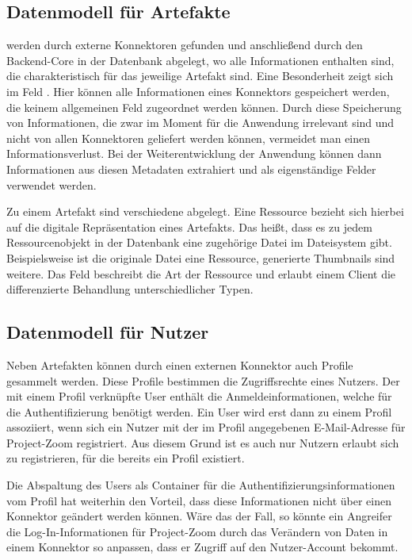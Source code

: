 \subsection{Datenmodell für Artefakte}

 werden durch externe Konnektoren gefunden und anschließend durch den Backend-Core in der Datenbank abgelegt, wo alle Informationen enthalten sind, die charakteristisch für das jeweilige Artefakt sind. Eine Besonderheit zeigt sich im Feld . Hier können alle Informationen eines Konnektors gespeichert werden, die keinem allgemeinen Feld zugeordnet werden können. Durch diese Speicherung von Informationen, die zwar im Moment für die Anwendung irrelevant sind und nicht von allen Konnektoren geliefert werden können, vermeidet man einen Informationsverlust. Bei der Weiterentwicklung der Anwendung können dann Informationen aus diesen Metadaten extrahiert und als eigenständige Felder verwendet werden. 

Zu einem Artefakt sind verschiedene  abgelegt. Eine Ressource bezieht sich hierbei auf die digitale Repräsentation eines Artefakts. Das heißt, dass es zu jedem Ressourcenobjekt in der Datenbank eine zugehörige Datei im Dateisystem gibt. Beispielsweise ist die originale Datei eine Ressource, generierte Thumbnails sind weitere. Das Feld  beschreibt die Art der Ressource und erlaubt einem Client die differenzierte Behandlung unterschiedlicher Typen.  

\subsection{Datenmodell für Nutzer}

Neben Artefakten können durch einen externen Konnektor auch Profile gesammelt werden. Diese Profile bestimmen die Zugriffsrechte eines Nutzers. Der mit einem Profil verknüpfte User enthält die Anmeldeinformationen, welche für die Authentifizierung benötigt werden. Ein User wird erst dann zu einem Profil assoziiert, wenn sich ein Nutzer mit der im Profil angegebenen E-Mail-Adresse für Project-Zoom registriert. Aus diesem Grund ist es auch nur Nutzern erlaubt sich zu registrieren, für die bereits ein Profil existiert.

Die Abspaltung des Users als Container für die Authentifizierungsinformationen vom Profil hat weiterhin den Vorteil, dass diese Informationen nicht über einen Konnektor geändert werden können. Wäre das der Fall, so könnte ein Angreifer die Log-In-Informationen für Project-Zoom durch das Verändern von Daten in einem Konnektor so anpassen, dass er Zugriff auf den Nutzer-Account bekommt.

